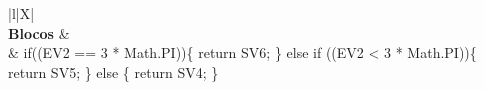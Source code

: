 \begin{xltabular}{\textwidth}{|l|X|}
		 \\ \hline
		\textbf{Blocos} &  \\ \hline
		 & if((EV2 == 3 * Math.PI))\{   return SV6; \} else if ((EV2 < 3 * Math.PI))\{   return SV5; \} else \{   return SV4; \} \\ \hline



\end{xltabular}
